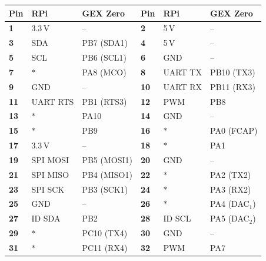\begin{table}[h]
	  \begin{tabularx}{\textwidth}{W{.1\textwidth}XX|W{.1\textwidth}XX}
	    	\toprule
	    	\textbf{Pin} & \textbf{RPi} & \textbf{GEX Zero} &
	    	\textbf{Pin} & \textbf{RPi} & \textbf{GEX Zero} \\
	    	
	    	\midrule
	    	\textbf{1} & \leavevmode\color{red}3.3\,V & -- &
	    	\textbf{2} & \leavevmode\color{red}5\,V & -- \\
	    	\textbf{3} & \IIC SDA & PB7 (SDA1) & 
	    	\textbf{4} & \leavevmode\color{red}5\,V & -- \\
	    	\textbf{5} & \IIC SCL & PB6 (SCL1) & 
	    	\textbf{6} & \leavevmode\color{blue}GND & -- \\
	    	\textbf{7} & $\ast$ & PA8 (MCO) & 
	    	\textbf{8} & UART TX & PB10 (TX3) \\
	    	
	    	\midrule
	    	\textbf{9} & \leavevmode\color{blue}GND & --
	    	& \textbf{10} & UART RX & PB11 (RX3) \\
	    	\textbf{11} & UART RTS & PB1 (RTS3)
	    	& \textbf{12} & PWM & PB8 \\
	    	\textbf{13} & $\ast$ & PA10 
	    	& \textbf{14} & \leavevmode\color{blue}GND & -- \\
	    	\textbf{15} & $\ast$ & PB9
	    	& \textbf{16} &  $\ast$ & PA0 (FCAP)\\
	    	
	    	\midrule
	    	\textbf{17} & \leavevmode\color{red}3.3\,V & --
	    	& \textbf{18} &  $\ast$ & PA1 \\
	    	\textbf{19} & SPI MOSI & PB5 (MOSI1)
	    	& \textbf{20} & \leavevmode\color{blue}GND & -- \\
	    	\textbf{21} & SPI MISO & PB4 (MISO1)
	    	& \textbf{22} &  $\ast$ & PA2 (TX2) \\
	    	\textbf{23} & SPI SCK & PB3 (SCK1)
	    	& \textbf{24} &  $\ast$ & PA3 (RX2) \\
	    	
	    	\midrule
	    	\textbf{25} & \leavevmode\color{blue}GND & --
	    	& \textbf{26} &  $\ast$ & PA4 (DAC$_1$) \\
	    	\textbf{27} & ID \IIC SDA & PB2 
	    	& \textbf{28} & ID \IIC SCL & PA5 (DAC$_2$) \\
	    	\textbf{29} & $\ast$ & PC10 (TX4)
	    	& \textbf{30} & \leavevmode\color{blue}GND & -- \\
	    	\textbf{31} & $\ast$ & PC11 (RX4)
	    	& \textbf{32} & PWM & PA7 \\
	    	

\end{tabularx}
\end{table}
